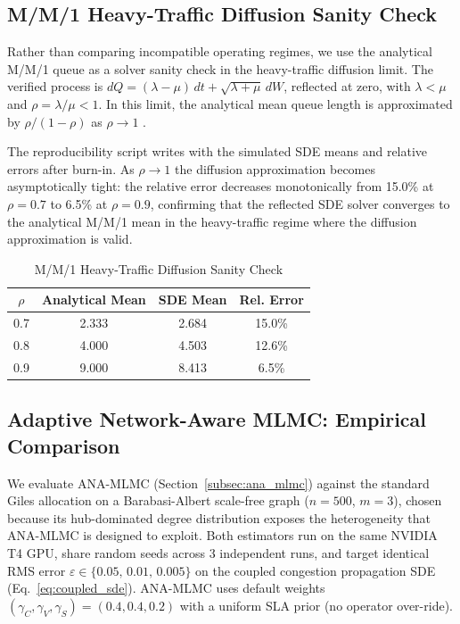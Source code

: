 \documentclass{ieeeaccess}
\newcommand{\mmonererr}{6.5}
\newcommand{\mmonererrA}{15.0}
\newcommand{\mmonererrB}{12.6}
\newcommand{\mmonererrC}{6.5}
\begin{document}
\subsection{M/M/1 Heavy-Traffic Diffusion Sanity Check}
\label{subsec:analytical}

Rather than comparing incompatible operating regimes, we use the analytical M/M/1 queue as a
solver sanity check in the heavy-traffic diffusion limit. The verified process is
$dQ = (\lambda-\mu)\,dt + \sqrt{\lambda+\mu}\,dW$, reflected at zero, with $\lambda < \mu$ and
$\rho=\lambda/\mu<1$. In this limit, the analytical mean queue length is approximated by
$\rho/(1-\rho)$ as $\rho \to 1$ \cite{whitt2002,harrison1985,kang2007}.

The reproducibility script  writes
 with the simulated SDE means and relative errors after burn-in.
As $\rho\!\to\!1$ the diffusion approximation becomes asymptotically tight: the relative error
decreases monotonically from \mmonererrA\% at $\rho=0.7$ to \mmonererr\% at $\rho=0.9$,
confirming that the reflected SDE solver converges to the analytical M/M/1 mean in the
heavy-traffic regime where the diffusion approximation is valid.

\begin{table}[!t]
\caption{M/M/1 Heavy-Traffic Diffusion Sanity Check}
\label{tab:mm1_sanity}
\centering
\begin{tabular}{@{}c c c c@{}}
\toprule
$\rho$ & Analytical Mean & SDE Mean & Rel. Error \\
\midrule
0.7 & 2.333 & 2.684 & \mmonererrA\% \\
0.8 & 4.000 & 4.503 & \mmonererrB\% \\
0.9 & 9.000 & 8.413 & \mmonererrC\% \\
\bottomrule
\end{tabular}
\end{table}

\subsection{Adaptive Network-Aware MLMC: Empirical Comparison}
\label{subsec:ana_results}

We evaluate ANA-MLMC (Section~\ref{subsec:ana_mlmc}) against the standard Giles allocation on a
Barabasi-Albert scale-free graph ($n=500$, $m=3$), chosen because its hub-dominated degree
distribution exposes the heterogeneity that ANA-MLMC is designed to exploit. Both estimators run
on the same NVIDIA T4 GPU, share random seeds across 3 independent runs, and target identical RMS
error $\varepsilon \in \{0.05,\,0.01,\,0.005\}$ on the coupled congestion propagation SDE
(Eq.~\eqref{eq:coupled_sde}). ANA-MLMC uses default weights
$(\gamma_C,\gamma_V,\gamma_S)=(0.4,0.4,0.2)$ with a uniform SLA prior (no operator over-ride).
\end{document}
